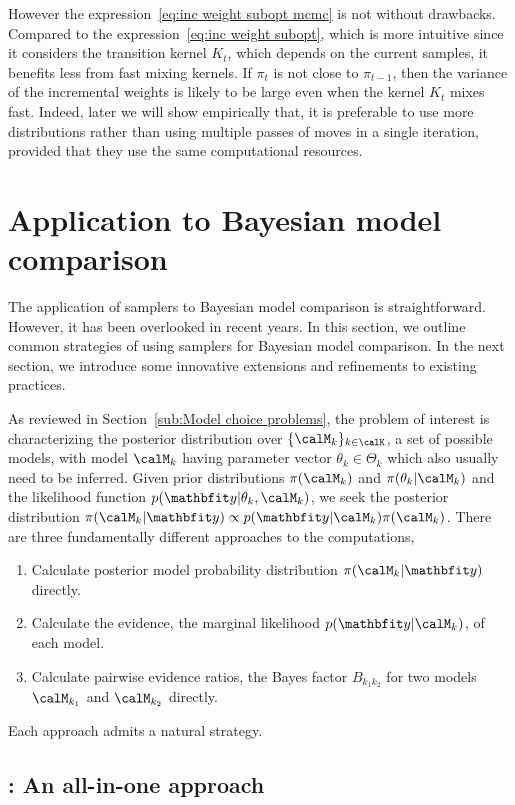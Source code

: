 However the expression~\eqref{eq:inc weight subopt mcmc} is not without drawbacks. Compared to the expression~\eqref{eq:inc weight subopt}, which is more intuitive since it considers the transition kernel $K_t$, which depends on the current samples, it benefits less from fast mixing kernels. If $\pi_t$ is not close to $\pi_{t-1}$, then the variance of the incremental weights is likely to be large even when the kernel $K_t$ mixes fast. Indeed, later we will show empirically that, it is preferable to use more distributions rather than using multiple passes of \mcmc moves in a single iteration, provided that they use the same computational resources.

\section{Application to Bayesian model comparison}
\label{sec:Application to Bayesian model comparison}

The application of \smc samplers to Bayesian model comparison is straightforward. However, it has been overlooked in recent years. In this section, we outline common strategies of using \smc samplers for Bayesian model comparison. In the next section, we introduce some innovative extensions and refinements to existing practices.

As reviewed in Section~\ref{sub:Model choice problems}, the problem of interest is characterizing the posterior distribution over $\{\calM_k\}_{k\in\calK}$, a set of possible models, with model $\calM_k$ having parameter vector $\theta_k\in\Theta_k$ which also usually need to be inferred. Given prior distributions $\pi(\calM_k)$ and $\pi(\theta_k|\calM_k)$ and the likelihood function $p(\data|\theta_k,\calM_k)$, we seek the posterior distribution $\pi(\calM_k|\data)\propto p(\data|\calM_k)\pi(\calM_k)$. There are three fundamentally different approaches to the computations,
\begin{enumerate}
  \item Calculate posterior model probability distribution $\pi(\calM_k|\data)$ directly.
  \item Calculate the evidence, the marginal likelihood $p(\data|\calM_k)$, of each model.
  \item Calculate pairwise evidence ratios, the Bayes factor $B_{k_1k_2}$ for two models $\calM_{k_1}$ and $\calM_{k_2}$ directly.
\end{enumerate}
Each approach admits a natural \smc strategy.

\subsection[SMC1: An all-in-on approach]{\smc[1]: An all-in-one approach}
\label{sub:smc1: An all-in-one approach}


